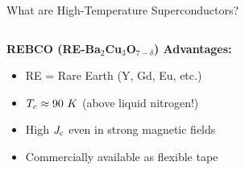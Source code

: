 \begin{frame}{What are High-Temperature Superconductors?}
\begin{columns}
\begin{column}{0.6\textwidth}
            \vspace{0.3cm}
            \textbf{REBCO (RE-Ba$_2$Cu$_3$O$_{7-\delta}$) Advantages:}
            \begin{itemize}
                \item RE = Rare Earth (Y, Gd, Eu, etc.)
                \item $T_c \approx 90~K$ (above liquid nitrogen!)
                \item High $J_\text{c}$ even in strong magnetic fields
                \item Commercially available as flexible tape
            \end{itemize}
        \end{column}
        \begin{column}{0.4\textwidth}
            \centering
        \end{column}
    \end{columns}
\end{frame}

